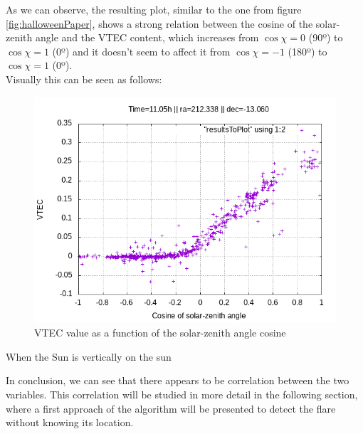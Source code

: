 As we can observe, the resulting plot, similar to the one from figure \ref{fig:halloweenPaper}, shows a strong relation between the cosine of the solar-zenith angle and the VTEC content, which increases from $\cos\chi = 0$ (90º) to $\cos\chi = 1$ (0º) and it doesn't seem to affect it from $\cos\chi = -1$ (180º) to $\cos\chi = 1$ (0º). \\

Visually this can be seen as follows:

\begin{figure}[!htb]
	\begin{centering}
		\includegraphics[width=0.5\linewidth]{images/ch4/resultSunTest.png}
		\caption{VTEC value as a function of the solar-zenith angle cosine}
		\label{fig:comparison}
	\end{centering}
\end{figure}

When the Sun is vertically on the sun





In conclusion, we can see that there appears to be correlation between the two variables. This correlation will be studied in more detail in the following section, where a first approach of the algorithm will be presented to detect the flare without knowing its location.













